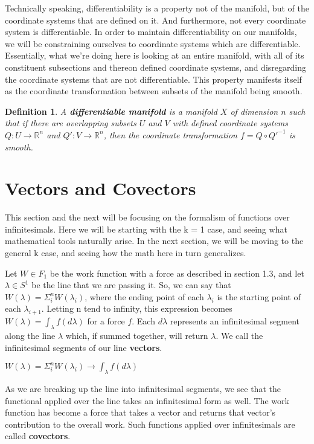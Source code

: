 \documentclass{book}
\newtheorem{defn}[equation]{Definition}
\begin{document}
Technically speaking, differentiability is a property not of the manifold, but of the coordinate systems that are defined on it. And furthermore, not every coordinate system is differentiable. In order to maintain differentiability on our manifolds, we will be constraining ourselves to coordinate systems which are differentiable. Essentially, what we're doing here is looking at an entire manifold, with all of its constituent subsections and thereon defined coordinate systems, and disregarding the coordinate systems that are not differentiable. This property manifests itself as the coordinate transformation between subsets of the manifold being smooth. 


\begin{defn}
	A \textbf{differentiable manifold} is a manifold $X$ of dimension $n$ such that if there are overlapping subsets $U$ and $V$ with defined coordinate systems $Q: U \to \mathbb{R}^n$ and $Q': V \to \mathbb{R}^n$, then the coordinate transformation $f = Q \circ Q'^{-1}$ is smooth. 
\end{defn}





\section{Vectors and Covectors}


This section and the next will be focusing on the formalism of functions over infinitesimals. Here we will be starting with the k = 1 case, and seeing what mathematical tools naturally arise. In the next section, we will be moving to the general k case, and seeing how the math here in turn generalizes. 


Let $W \in F_1$ be the work function with a force as described in section 1.3, and let $\lambda \in S^1$ be the line that we are passing it. So, we can say that $W(\lambda) = \Sigma^n_iW(\lambda_i)$, where the ending point of each $\lambda_i$ is the starting point of each $\lambda_{i+1}$. Letting n tend to infinity, this expression becomes $W(\lambda) = \int_{\lambda} f(d\lambda)$ for a force $f$. Each $d\lambda$ represents an infinitesimal segment along the line $\lambda$ which, if summed together, will return $\lambda$. We call the infinitesimal segments of our line \textbf{vectors}. 

$W(\lambda) = \Sigma^n_iW(\lambda_i) \to \int_{\lambda} f(d\lambda)$

As we are breaking up the line into infinitesimal segments, we see that the functional applied over the line takes an infinitesimal form as well. The work function has become a force that takes a vector and returns that vector's contribution to the overall work. Such functions applied over infinitesimals are called \textbf{covectors}. 
\end{document}
